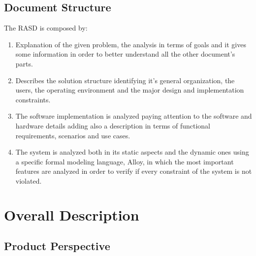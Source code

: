 \documentclass[a4paper]{article}
\begin{document}
\clearpage    

\subsection{Document Structure}

The RASD is composed by:
\begin{enumerate}
    \item Explanation of the given problem, the analysis in terms of goals and it gives some information in order to better understand all the other document's parts.
    \item Describes the solution structure identifying it's general organization, the users, the operating environment and the major design and implementation constraints.
    \item The software implementation is analyzed paying attention to the software and hardware details adding also a description in terms of functional requirements, scenarios and use cases.
    \item The system is analyzed both in its static aspects and the dynamic ones using a specific formal modeling language, Alloy, in which the most important features are analyzed in order to verify if every constraint of the system is not violated.
\end{enumerate}

\clearpage

\section{Overall Description}

\subsection{Product Perspective}
\end{document}
